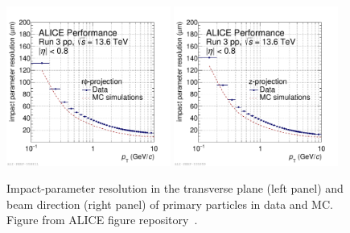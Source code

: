 \begin{figure}[tbh]
    \begin{center}
    \includegraphics[width=0.48\textwidth]{Figures/Chapter 6/sigmadcaxy_lhc22o_pass4_qm.pdf}
    \includegraphics[width=0.48\textwidth]{Figures/Chapter 6/sigmadcaz_lhc22q_pass2_lhcc.pdf}
    \caption{Impact-parameter resolution in the transverse plane (left panel) and beam direction (right panel) of primary particles in data and MC. Figure from ALICE figure repository~\cite{ALICE_figures}.} 
    \label{fig:dca_res} 
    \end{center}
\end{figure}

